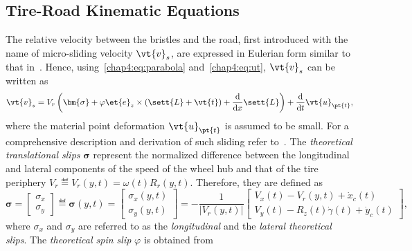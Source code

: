 
\subsection{Tire-Road Kinematic Equations}
\label{chap4:sec:kinematic_equations}

The relative velocity between the bristles and the road, first introduced with the name of micro-sliding velocity $\vt{v}_s$, are expressed in Eulerian form similar to that in~\cite{romano2019novel, romano2020unsteadystate, romano2022brush, romano2022analytical, pacejka2012tire, guiggiani2014science, limebeer2018dynamics}. Hence, using~\eqref{chap4:eq:parabola} and~\eqref{chap4:eq:ut}, $\vt{v}_s$ can be written as
%
\begin{equation}
  \vt{v}_s = V_r\left(\bm{\sigma} + \varphi\et{e}_z \times \left(\sett{L} + \vt{t}\right) + \dfrac{\mathrm{d}}{\mathrm{d}x}\sett{L}\right) + \dfrac{\mathrm{d}}{\mathrm{d}t}\vt{u}_{\pt{t}}
  \label{chap4:eq:v_s},
\end{equation}
%
where the material point deformation $\vt{u}_{\pt{t}}$ is assumed to be small. For a comprehensive description and derivation of such sliding refer to~\cite{rill2020road, pacejka2012tire, guiggiani2014science, limebeer2018dynamics, romano2019novel, romano2022brush, romano2022analytical}. The \emph{theoretical translational slips} $\bm{\sigma}$ represent the normalized difference between the longitudinal and lateral components of the speed of the wheel hub and that of the tire periphery $V_r \eqdef V_r(y,t) = \omega(t)R_r(y,t)$. Therefore, they are defined as
%
\begin{equation}
  \bm{\sigma} =
  \begin{bmatrix}
    \sigma_x \\[0.2em]
    \sigma_y
  \end{bmatrix}
  \eqdef \bm{\sigma}(y,t) =
  \begin{bmatrix}
    \sigma_x(y,t) \\[0.2em]
    \sigma_y(y,t)
  \end{bmatrix}
  = -\dfrac{1}{|V_r(y,t)|}
  \begin{bmatrix}
    V_x(t) - V_r(y,t) + \dot{x}_c(t) \\[0.2em]
    V_y(t) - R_z(t)\dot{\gamma}(t) + \dot{y}_c(t)
  \end{bmatrix},
\end{equation}
%
where $\sigma_x$ and $\sigma_y$ are referred to as the \emph{longitudinal} and the \emph{lateral theoretical slips}. The \emph{theoretical spin slip} $\varphi$ is obtained from
